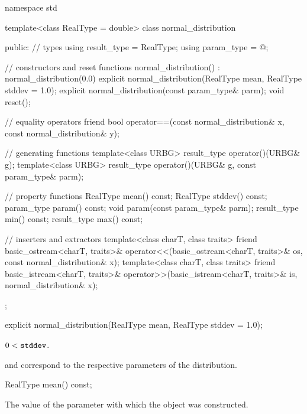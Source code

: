 %
%
\begin{codeblock}
namespace std {
  template<class RealType = double>
  class normal_distribution {
  public:
    // types
    using result_type = RealType;
    using param_type  = @\unspec@;

    // constructors and reset functions
    normal_distribution() : normal_distribution(0.0) {}
    explicit normal_distribution(RealType mean, RealType stddev = 1.0);
    explicit normal_distribution(const param_type& parm);
    void reset();

    // equality operators
    friend bool operator==(const normal_distribution& x, const normal_distribution& y);

    // generating functions
    template<class URBG>
      result_type operator()(URBG& g);
    template<class URBG>
      result_type operator()(URBG& g, const param_type& parm);

    // property functions
    RealType mean() const;
    RealType stddev() const;
    param_type param() const;
    void param(const param_type& parm);
    result_type min() const;
    result_type max() const;

    // inserters and extractors
    template<class charT, class traits>
      friend basic_ostream<charT, traits>&
        operator<<(basic_ostream<charT, traits>& os, const normal_distribution& x);
    template<class charT, class traits>
      friend basic_istream<charT, traits>&
        operator>>(basic_istream<charT, traits>& is, normal_distribution& x);
  };
}
\end{codeblock}


%
\begin{itemdecl}
explicit normal_distribution(RealType mean, RealType stddev = 1.0);
\end{itemdecl}

\begin{itemdescr}
\pnum
\expects
$0 < \texttt{\protect stddev}$.

\pnum
\remarks
{} and 
correspond to the respective parameters of the distribution.
\end{itemdescr}

%
\begin{itemdecl}
RealType mean() const;
\end{itemdecl}

\begin{itemdescr}
\pnum
\returns
The value of the  parameter
 with which the object was constructed.
\end{itemdescr}

